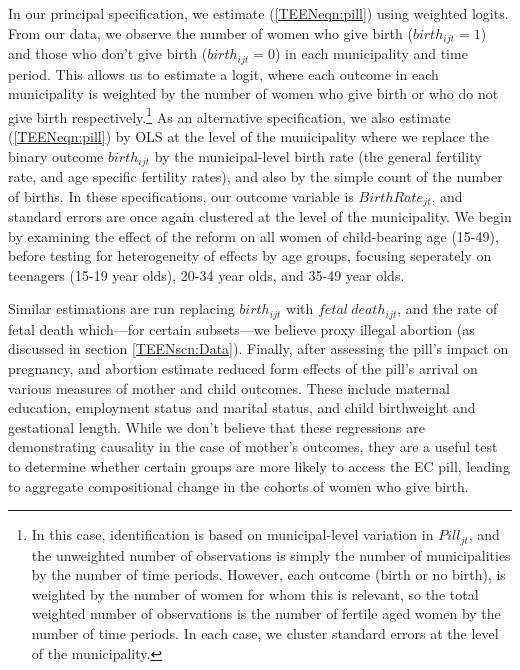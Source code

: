 In our principal specification, we estimate (\ref{TEENeqn:pill}) using weighted
logits.  From our data, we observe the number of women who give birth 
($birth_{ijt}=1$) and those who don't give birth ($birth_{ijt}=0$) in each 
municipality and time period.  This allows us to estimate a logit, where each 
outcome in each municipality is weighted by the number of women who give birth 
or who do not give birth respectively.\footnote{In this case, identification is
based on municipal-level variation in $Pill_{jt}$, and the unweighted number of
observations is simply the number of municipalities by the number of time 
periods.  However, each outcome (birth or no birth), is weighted by the number
of women for whom this is relevant, so the total weighted number of observations 
is the number of fertile aged women by the number of time periods. In each case,
we cluster standard errors at the level of the municipality.} As an alternative
specification, we also estimate (\ref{TEENeqn:pill}) by OLS at the level of 
the municipality where we replace the binary outcome $birth_{ijt}$ by the 
municipal-level birth rate (the general fertility rate, and age specific 
fertility rates), and also by the simple count of the number of births. In 
these specifications, our outcome variable is $BirthRate_{jt}$, and standard 
errors are once again clustered at the level of the municipality.  We begin by
examining the effect of the reform on all women of child-bearing age (15-49), 
before testing for heterogeneity of effects by age groups, focusing seperately
on teenagers (15-19 year olds), 20-34 year olds, and 35-49 year olds.

Similar estimations are run replacing $birth_{ijt}$ with $fetal\ death_{ijt}$,
and the rate of fetal death which---for certain subsets---we believe proxy 
illegal abortion (as discussed in section \ref{TEENscn:Data}).  Finally, after 
assessing the pill's impact on pregnancy, and abortion \person estimate reduced 
form effects of the pill's arrival on various measures of mother and child 
outcomes.  These include maternal education, employment status and marital 
status, and child birthweight and gestational length.  While we don't believe 
that these regressions are demonstrating causality in the case of mother's 
outcomes, they are a useful test to determine whether certain groups are more 
likely to access the EC pill, leading to aggregate compositional change in the 
cohorts of women who give birth.

